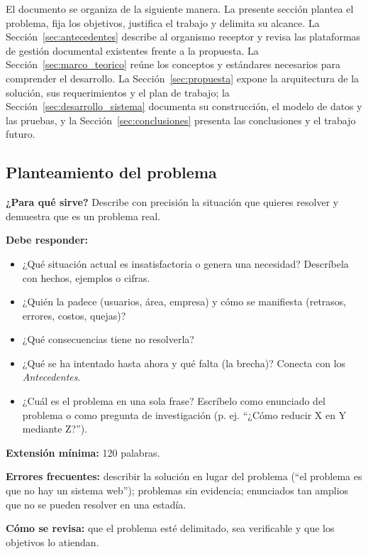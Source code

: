 El documento se organiza de la siguiente manera. La presente sección plantea el problema, fija los objetivos, justifica el trabajo y delimita su alcance. La Sección~\ref{sec:antecedentes} describe al organismo receptor y revisa las plataformas de gestión documental existentes frente a la propuesta. La Sección~\ref{sec:marco_teorico} reúne los conceptos y estándares necesarios para comprender el desarrollo. La Sección~\ref{sec:propuesta} expone la arquitectura de la solución, sus requerimientos y el plan de trabajo; la Sección~\ref{sec:desarrollo_sistema} documenta su construcción, el modelo de datos y las pruebas, y la Sección~\ref{sec:conclusiones} presenta las conclusiones y el trabajo futuro.

\subsection{Planteamiento del problema} \label{sec:problema} %

\begin{guia}
\textbf{¿Para qué sirve?} Describe con precisión la situación que quieres resolver y demuestra que es un problema real.

\textbf{Debe responder:}
\begin{itemize}[nosep,leftmargin=*]
  \item ¿Qué situación actual es insatisfactoria o genera una necesidad? Descríbela con hechos, ejemplos o cifras.
  \item ¿Quién la padece (usuarios, área, empresa) y cómo se manifiesta (retrasos, errores, costos, quejas)?
  \item ¿Qué consecuencias tiene no resolverla?
  \item ¿Qué se ha intentado hasta ahora y qué falta (la brecha)? Conecta con los \emph{Antecedentes}.
  \item ¿Cuál es el problema en una sola frase? Escríbelo como enunciado del problema o como pregunta de
        investigación (p. ej. ``¿Cómo reducir X en Y mediante Z?'').
\end{itemize}

\textbf{Extensión mínima:} 120 palabras.

\textbf{Errores frecuentes:} describir la solución en lugar del problema (``el problema es que no hay un sistema web'');
problemas sin evidencia; enunciados tan amplios que no se pueden resolver en una estadía.

\textbf{Cómo se revisa:} que el problema esté delimitado, sea verificable y que los objetivos lo atiendan.
\end{guia}

